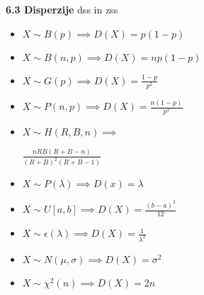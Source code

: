 \documentclass{article}
\begin{document}
\begin{multicols}{3}
\textbf{6.3 Disperzije} dss in zss
\begin{itemize}
    \item \begin{math}
        X \sim B(p) \implies D(X) = p(1 - p)
    \end{math}
    \item \begin{math}
        X \sim B(n, p) \implies D(X) = np(1 - p)
    \end{math}
    \item \begin{math}
        X \sim G(p) \implies D(X) = \frac{1 - p}{p^2}
    \end{math}
    \item \begin{math}
        X \sim P(n, p) \implies D(X) = \frac{n(1 - p)}{p^2}
    \end{math}
    \item
    \begin{math}
        X \sim H(R, B, n) \implies
    \end{math}
    \begin{center}
        \begin{math}
            \frac{
                nRB(R + B - n)
            }{
                (R + B)^2 (R + B - 1)
            }
        \end{math}
    \end{center}
    \item \begin{math}
        X \sim P(\lambda) \implies D(x) = \lambda
    \end{math}
    \item \begin{math}
        X \sim U[a, b] \implies D(X) = \frac{(b - a)^2}{12}
    \end{math}
    \item  \begin{math}
        X \sim \epsilon(\lambda) \implies D(X) = \frac{1}{\lambda^2}
    \end{math}
    \item \begin{math}
        X \sim N(\mu, \sigma ) \implies D(X) = \sigma^2
    \end{math}
    \item \begin{math}
        X \sim \chi^{2}(n) \implies D(X) = 2n
    \end{math}
\end{itemize}


\end{multicols}
\end{document}
